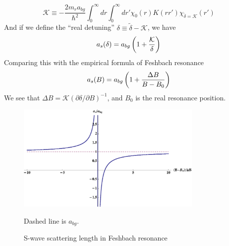 \begin{equation}\label{eq:intro:kappa}
\mathcal{K}\equiv-\frac{2m_{r}a_{bg}}{\hbar^{2}}\int_{0}^{\infty}{dr}\int_{0}^{\infty}dr'\chi_{0}(r)K(rr')\chi_{\tilde\delta=\mathcal{K}}(r')
\end{equation}
And if we define the ``real detuning'' $\delta\equiv\tilde\delta-\mathcal{K}$, we have 
\begin{equation}\label{eq:intro:asK}
a_{s}(\delta)=a_{bg}\left(1+\frac{\mathcal{K}}{\delta}\right)
\end{equation}
Comparing this with the empirical formula of Feshbach resonance
\begin{equation}
a_{s}(B)=a_{bg}\left(1+\frac{\Delta{B}}{B-B_{0}}\right)
\end{equation}
We see that $\Delta{B}=\mathcal{K}(\partial\delta/\partial{B})^{-1}$, and $B_{0}$ is the real resonance position.  %
\begin{figure}[htbp]
\begin{center}
\includegraphics[width=0.8\textwidth]{FeshbachAs}
\caption{S-wave scattering length in Feshbach resonance} 
\label{fig:intro:Feshbach}
{\small Dashed line is $a_{bg}$.}
\end{center}
\end{figure}

